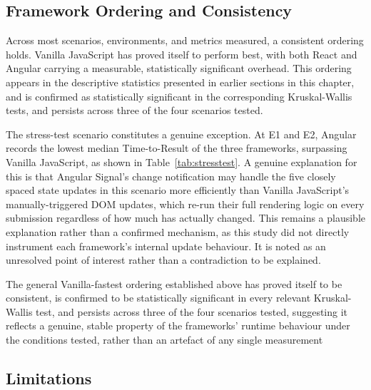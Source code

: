 \documentclass[11pt,a4paper]{report}
\begin{document}
\subsection{Framework Ordering and Consistency}
\label{sec:framework-ordering}

\vspace{5mm}

Across most scenarios, environments, and metrics measured, a consistent ordering holds. Vanilla JavaScript has proved itself to perform best, with both React and Angular carrying a measurable, statistically significant overhead. This ordering appears in the descriptive statistics presented in earlier sections in this chapter, and is confirmed as statistically significant in the corresponding Kruskal-Wallis tests, and persists across three of the four scenarios tested. 

\vspace{5mm}

The stress-test scenario constitutes a genuine exception. At E1 and E2, Angular records the lowest median Time-to-Result of the three frameworks, surpassing Vanilla JavaScript, as shown in Table~\ref{tab:stresstest}. A genuine explanation for this is that Angular Signal's change notification may handle the five closely spaced state updates in this scenario more efficiently than Vanilla JavaScript's manually-triggered DOM updates, which re-run their full rendering logic on every submission regardless of how much has actually changed. This remains a plausible explanation rather than a confirmed mechanism, as this study did not directly instrument each framework's internal update behaviour. It is noted as an unresolved point of interest rather than a contradiction to be explained. 

\vspace{5mm}

The general Vanilla-fastest ordering established above has proved itself to be consistent, is confirmed to be statistically significant in every relevant Kruskal-Wallis test, and persists across three of the four scenarios tested, suggesting it reflects a genuine, stable property of the frameworks' runtime behaviour under the conditions tested, rather than an artefact of any single measurement

\subsection{Limitations}
\label{sec:limitations}

\vspace{5mm}
\end{document}
